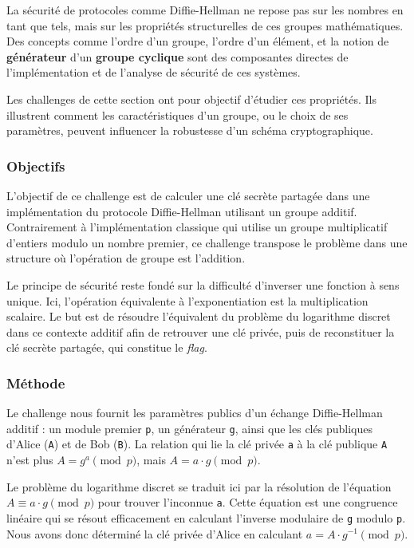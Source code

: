 \documentclass[12pt, a4paper]{article}
\begin{document}
            La sécurité de protocoles comme Diffie-Hellman ne repose pas sur les nombres en tant que tels, mais sur les propriétés structurelles de ces groupes mathématiques. Des concepts comme l'ordre d'un groupe, l'ordre d'un élément, et la notion de \textbf{générateur} d'un \textbf{groupe cyclique} sont des composantes directes de l'implémentation et de l'analyse de sécurité de ces systèmes.
            
            Les challenges de cette section ont pour objectif d'étudier ces propriétés. Ils illustrent comment les caractéristiques d'un groupe, ou le choix de ses paramètres, peuvent influencer la robustesse d'un schéma cryptographique.

        \subsubsection{Objectifs}

            L'objectif de ce challenge est de calculer une clé secrète partagée dans une implémentation du protocole Diffie-Hellman utilisant un groupe additif. Contrairement à l'implémentation classique qui utilise un groupe multiplicatif d'entiers modulo un nombre premier, ce challenge transpose le problème dans une structure où l'opération de groupe est l'addition.
            
            Le principe de sécurité reste fondé sur la difficulté d'inverser une fonction à sens unique. Ici, l'opération équivalente à l'exponentiation est la multiplication scalaire. Le but est de résoudre l'équivalent du problème du logarithme discret dans ce contexte additif afin de retrouver une clé privée, puis de reconstituer la clé secrète partagée, qui constitue le \textit{flag}.
            
            \subsubsection{Méthode}
            
            Le challenge nous fournit les paramètres publics d'un échange Diffie-Hellman additif : un module premier \texttt{p}, un générateur \texttt{g}, ainsi que les clés publiques d'Alice (\texttt{A}) et de Bob (\texttt{B}). La relation qui lie la clé privée \texttt{a} à la clé publique \texttt{A} n'est plus $A = g^a \pmod{p}$, mais $A = a \cdot g \pmod{p}$.
            
            Le problème du logarithme discret se traduit ici par la résolution de l'équation $A \equiv a \cdot g \pmod{p}$ pour trouver l'inconnue \texttt{a}. Cette équation est une congruence linéaire qui se résout efficacement en calculant l'inverse modulaire de \texttt{g} modulo \texttt{p}. Nous avons donc déterminé la clé privée d'Alice en calculant $a = A \cdot g^{-1} \pmod{p}$.
            
\end{document}
